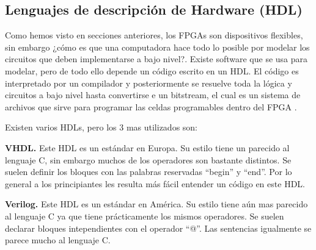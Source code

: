 \documentclass[twoside,spanish,ESP,MSc]{plantillaLabUPV}
\theoremstyle{definition}
\newcommand{\f}{FPGA }
\newcommand{\fs}{FPGAs }
\begin{document}



\subsection{Lenguajes de descripción de Hardware (HDL)}

Como hemos visto en secciones anteriores, los \fs son dispositivos flexibles, sin embargo ¿cómo es que una computadora hace todo lo posible por modelar los circuitos que deben implementarse a bajo nivel?. Existe software que se usa para modelar, pero de todo ello depende un código escrito en un HDL. El código es interpretado por un compilador y posteriormente se resuelve toda la lógica y circuitos a bajo nivel hasta convertirse e un bitstream, el cual es un sistema de archivos que sirve para programar las celdas programables dentro del \f.

Existen varios HDLs, pero los 3 mas utilizados son:


\checkmark\textbf{VHDL.} Este HDL es un estándar en Europa. Su estilo tiene un parecido al lenguaje C, sin embargo muchos de los operadores son bastante distintos. Se suelen definir los bloques con las palabras reservadas ``begin'' y ``end''. Por lo general a los principiantes les resulta más fácil entender un código en este HDL.


\checkmark\textbf{Verilog.} Este HDL es un estándar en América. Su estilo tiene aún mas parecido al lenguaje C ya que tiene prácticamente los mismos operadores. Se suelen declarar bloques intependientes con el operador ``@''. Las sentencias igualmente se parece mucho al lenguaje C.
\end{document}
